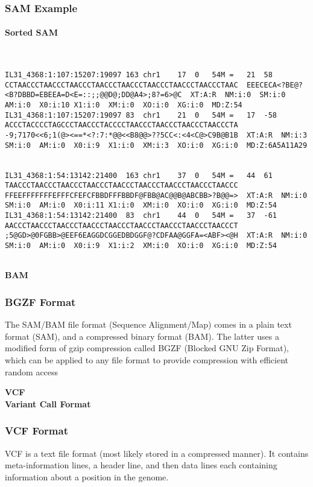 \documentclass{beamer}
\newcommand{\centeredtitle}[1]{
\begin{center}
    \Huge{\bf{#1}}
\end{center}
}
\newcommand{\hugeslide}[1]{
\begin{frame}
\centeredtitle{#1}
\end{frame}
}
\begin{document}
\begin{frame}[fragile]
\frametitle{SAM Example}
\framesubtitle{Sorted SAM}
\begin{framed}\tiny
\begin{verbatim}


IL31_4368:1:107:15207:19097	163	chr1	17	0	54M	=	21	58	CCTAACCCTAACCCTAACCCTAACCCTAACCCTAACCCTAACCCTAACCCTAAC	EEECECA<?BE@?<B?DBBD=EBEEA=D<E=::;;@@D@;DD@A4>;8?=6>@C	XT:A:R	NM:i:0	SM:i:0	AM:i:0	X0:i:10	X1:i:0	XM:i:0	XO:i:0	XG:i:0	MD:Z:54
IL31_4368:1:107:15207:19097	83	chr1	21	0	54M	=	17	-58	ACCCTACCCCTAGCCCTAACCCTACCCCTAACCCTAACCCTAACCCTAACCCTA	-9;7170<<6;1(@><==*<?:7:*@@<<B8@@>??5CC<:<4<C@>C9B@B1B	XT:A:R	NM:i:3	SM:i:0	AM:i:0	X0:i:9	X1:i:0	XM:i:3	XO:i:0	XG:i:0	MD:Z:6A5A11A29


IL31_4368:1:54:13142:21400	163	chr1	37	0	54M	=	44	61	TAACCCTAACCCTAACCCTAACCCTAACCCTAACCCTAACCCTAACCCTAACCC	FFEEFFFFFFFEFFFCFEFCFBBDFFFBBDF@FBB@AC@@B@ABCBB>?B@@=>	XT:A:R	NM:i:0	SM:i:0	AM:i:0	X0:i:11	X1:i:0	XM:i:0	XO:i:0	XG:i:0	MD:Z:54
IL31_4368:1:54:13142:21400	83	chr1	44	0	54M	=	37	-61	AACCCTAACCCTAACCCTAACCCTAACCCTAACCCTAACCCTAACCCTAACCCT	;5@GD>@0FGBB>@EEF6EAGGDCGGEDBDGGF@?CDFAA@GGFA=<ABF><@H	XT:A:R	NM:i:0	SM:i:0	AM:i:0	X0:i:9	X1:i:2	XM:i:0	XO:i:0	XG:i:0	MD:Z:54


\end{verbatim}
\end{framed}
\end{frame}


\hugeslide{BAM}

\begin{frame} 
\frametitle{BGZF Format}
The SAM/BAM file format (Sequence Alignment/Map) comes in a plain text format (SAM), and a compressed binary format (BAM). The latter uses a
modified form of gzip compression called BGZF (Blocked GNU Zip Format), which can be applied to any file format to provide compression with efficient random access
\end{frame}


\hugeslide{VCF\\Variant Call Format}

\begin{frame} 
\frametitle{VCF Format}
VCF is a text file format (most likely stored in a compressed manner). It contains meta-information lines, a header line, and then data lines each containing information about a position in the genome.
\end{frame}
\end{document}
